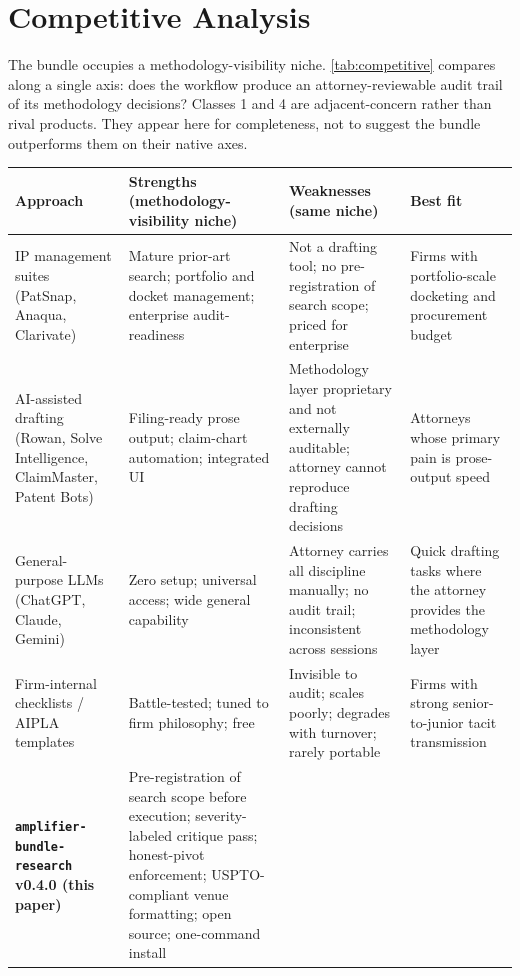 \documentclass[11pt,letterpaper]{article}
\begin{document}
\section{Competitive Analysis}

The bundle occupies a methodology-visibility niche.
\cref{tab:competitive} compares along a single axis: does the
workflow produce an attorney-reviewable audit trail of its
methodology decisions? Classes 1 and 4 are adjacent-concern rather
than rival products. They appear here for completeness, not
to suggest the bundle outperforms them on their native axes.

\begin{table}[h]
\centering
\scriptsize
\setlength\tabcolsep{3pt}
\begin{tabularx}{\linewidth}{@{}p{2.1cm} X X p{2.4cm}@{}}
\toprule
\textbf{Approach} & \textbf{Strengths (methodology-visibility niche)} & \textbf{Weaknesses (same niche)} & \textbf{Best fit} \\
\midrule
IP management suites (PatSnap, Anaqua, Clarivate)
  & Mature prior-art search; portfolio and docket management; enterprise audit-readiness
  & Not a drafting tool; no pre-registration of search scope; priced for enterprise
  & Firms with portfolio-scale docketing and procurement budget \\
\midrule
AI-assisted drafting (Rowan, Solve Intelligence, ClaimMaster, Patent Bots)
  & Filing-ready prose output; claim-chart automation; integrated UI
  & Methodology layer proprietary and not externally auditable; attorney cannot reproduce drafting decisions
  & Attorneys whose primary pain is prose-output speed \\
\midrule
General-purpose LLMs (ChatGPT, Claude, Gemini)
  & Zero setup; universal access; wide general capability
  & Attorney carries all discipline manually; no audit trail; inconsistent across sessions
  & Quick drafting tasks where the attorney provides the methodology layer \\
\midrule
Firm-internal checklists / AIPLA templates
  & Battle-tested; tuned to firm philosophy; free
  & Invisible to audit; scales poorly; degrades with turnover; rarely portable
  & Firms with strong senior-to-junior tacit transmission \\
\midrule
\textbf{\texttt{amplifier-bundle-research} v0.4.0 (this paper)}
  & Pre-registration of search scope before execution; severity-labeled critique pass; honest-pivot enforcement; USPTO-compliant venue formatting; open source; one-command install

\end{tabularx}
\end{table}
\end{document}
